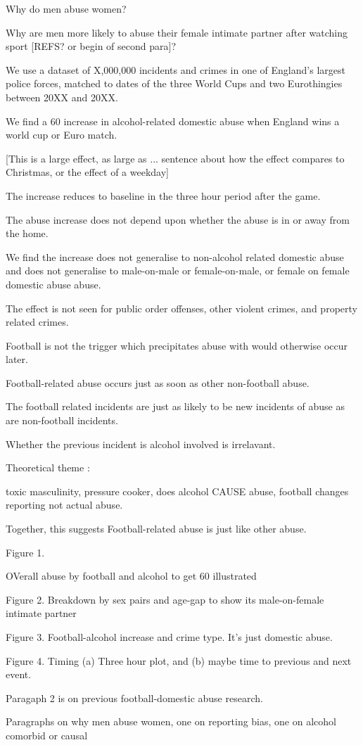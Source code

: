 \documentclass[12pt, letterpaper]{article}
\begin{document}
Why do men abuse women?


Why are men more likely to abuse their female intimate partner after watching sport [REFS? or begin of second para]?

We use a dataset of X,000,000 incidents and crimes in one of England's largest police forces, matched to dates of the three World Cups and two Eurothingies between 20XX and 20XX.

We find a 60 increase in alcohol-related domestic abuse when England wins a world cup or Euro match. 

[This is a large effect, as large as ... sentence about how the effect compares to Christmas, or the effect of a weekday]

The increase reduces to baseline in the three hour period after the game.

The abuse increase does not depend upon whether the abuse is in or away from the home.

We find the increase does not generalise to non-alcohol related domestic abuse and does not generalise to male-on-male or female-on-male, or female on female domestic abuse abuse. 

The effect is not seen for public order offenses, other violent crimes, and property related crimes.  

Football is not the trigger which precipitates abuse with would otherwise occur later. 

Football-related abuse occurs just as soon as other non-football abuse. 

The football related incidents are just as likely to be new incidents of abuse as are non-football incidents. 


Whether the previous incident is alcohol involved is irrelavant.

Theoretical theme :

toxic masculinity, pressure cooker, does alcohol CAUSE abuse, football changes reporting not actual abuse.

Together, this suggests Football-related abuse is just like other abuse. 


Figure 1.

OVerall abuse by football and alcohol to get 60 illustrated

Figure 2. Breakdown by sex pairs and age-gap to show its male-on-female intimate partner

Figure 3. Football-alcohol increase and crime type. It's just domestic abuse.

Figure 4. Timing (a) Three hour plot, and (b) maybe time to previous and next event.

Paragaph 2 is on previous football-domestic abuse research.

Paragraphs on why men abuse women, one on reporting bias, one on alcohol comorbid or causal
\end{document}
